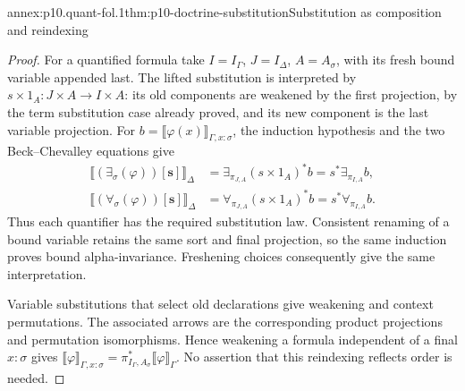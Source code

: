 \begin{annexitem}{annex:p10.quant-fol.1}{thm:p10-doctrine-substitution}{Substitution as composition and reindexing}
\begin{proof}
For a quantified formula take \(I=I_\Gamma\), \(J=I_\Delta\),
\(A=A_\sigma\), with its fresh bound variable appended last.
The lifted substitution is interpreted by
\(s\times1_A:J\times A\to I\times A\): its old components are
weakened by the first projection, by the term substitution case already
proved, and its new component is the last
variable projection. For \(b=\llbracket\varphi(x)\rrbracket_{\Gamma,x:\sigma}\),
the induction hypothesis and the two Beck--Chevalley equations give
\[
\begin{aligned}
 \llbracket(\exists_\sigma(\varphi))[\mathbf s]\rrbracket_\Delta
   &=\exists_{\pi_{J,A}}(s\times1_A)^*b
     =s^*\exists_{\pi_{I,A}}b,\\
 \llbracket(\forall_\sigma(\varphi))[\mathbf s]\rrbracket_\Delta
   &=\forall_{\pi_{J,A}}(s\times1_A)^*b
     =s^*\forall_{\pi_{I,A}}b.
\end{aligned}
\]
Thus each quantifier has the required substitution law.
Consistent renaming of a bound variable retains the same sort and
final projection, so the same induction proves bound alpha-invariance.
Freshening choices consequently give the same interpretation.

Variable substitutions that select old declarations give weakening
and context permutations. The associated arrows are the corresponding
product projections and permutation isomorphisms. Hence weakening a
formula independent of a final \(x:\sigma\) gives
\(\llbracket\varphi\rrbracket_{\Gamma,x:\sigma}
 =\pi_{I_\Gamma,A_\sigma}^*\llbracket\varphi\rrbracket_\Gamma\).
No assertion that this reindexing reflects order is needed.
\end{proof}
\end{annexitem}

